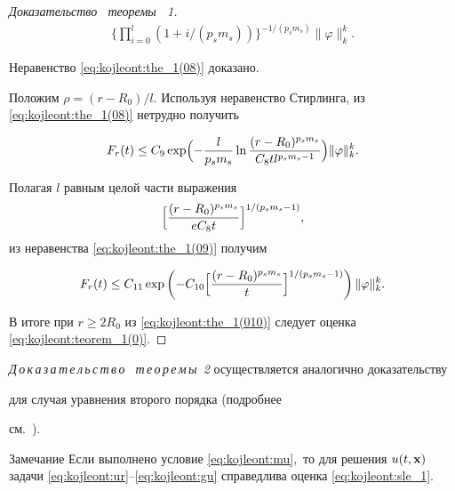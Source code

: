 \begin{proof}[Доказательство \ теоремы \ 1]
\begin{multline*}
\biggl\{\prod\limits_{i=0}^{l}\left(1+{i}/(p_sm_s)\right)\biggr\}^{-1/(p_sm_s)}

\|\varphi\|_k^k.

\end{multline*}

Неравенство \eqref{eq:kojleont:the_1(08)} доказано.



Положим $\rho=(r-R_0)/l$. Используя неравенство Стирлинга, из \eqref{eq:kojleont:the_1(08)} нетрудно получить

\begin{equation}

\label{eq:kojleont:the_1(09)}

F_{r}(t)\leq C_9\exp\Bigl(-\frac{l}{p_sm_s}\ln

\frac{(r-R_0)^{p_sm_s}}{C_8 tl^{p_sm_s-1}}\Bigr)\|\varphi\|_k^k.

\end{equation}

Полагая $l$ равным целой части выражения $$\displaystyle\Bigl[\frac{(r-R_0)^{p_sm_s}}{eC_8

t}\Bigr]^{1/(p_sm_s-1)},$$ из неравенства \eqref{eq:kojleont:the_1(09)} получим

\begin{equation}

\label{eq:kojleont:the_1(010)}

F_{r}(t)\leq C_{11}\exp\left(-C_{10}\Bigl[\frac{(r-R_0)^{p_sm_s}}{t}\Bigr]^{1/(p_sm_s-1)}\right)\|\varphi\|_k^k.

\end{equation}

В итоге при $r\geq 2R_0$ из \eqref{eq:kojleont:the_1(010)} следует оценка \eqref{eq:kojleont:teorem_1(0)}.

\end{proof}



\smallskip



\textit{Д\,о\,к\,а\,з\,а\,т\,е\,л\,ь\,с\,т\,в\,о \ т\,е\,о\,р\,е\,м\,ы~2}\/ осуществляется аналогично доказательству

для случая уравнения второго порядка (подробнее

см.~\cite{kojleont:bib:umg_2011,kojleont:bib:umg_2012}).



\smallskip



\begin{newthm}{Замечание} Если выполнено условие \eqref{eq:kojleont:mu}$,$  то для  решения $u(t,{\bf x})$ задачи \eqref{eq:kojleont:ur}--\eqref{eq:kojleont:gu} справедлива оценка  \eqref{eq:kojleont:sle_1}.

\end{newthm}



